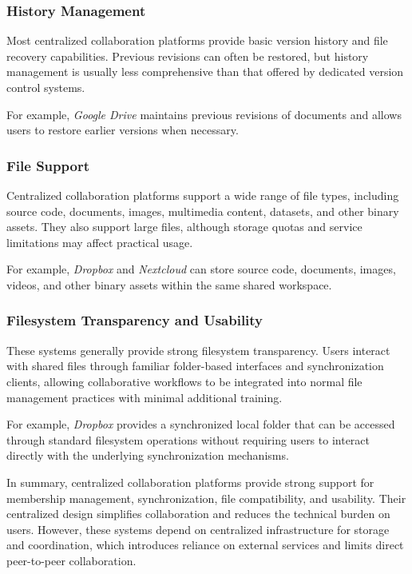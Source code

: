 \subsubsection{History Management}
Most centralized collaboration platforms provide basic version
history and file recovery capabilities. Previous revisions can
often be restored, but history management is usually less
comprehensive than that offered by dedicated version control
systems.

For example, \textit{Google Drive} maintains previous
revisions of documents and allows users to restore earlier
versions when necessary.

\subsubsection{File Support}
Centralized collaboration platforms support a wide range of
file types, including source code, documents, images,
multimedia content, datasets, and other binary assets. They
also support large files, although storage quotas and service
limitations may affect practical usage.

For example, \textit{Dropbox} and \textit{Nextcloud}
can store source code, documents, images, videos, and other
binary assets within the same shared workspace.

\subsubsection{Filesystem Transparency and Usability}
These systems generally provide strong filesystem transparency.
Users interact with shared files through familiar folder-based
interfaces and synchronization clients, allowing collaborative
workflows to be integrated into normal file management
practices with minimal additional training.

For example, \textit{Dropbox} provides a synchronized local
folder that can be accessed through standard filesystem
operations without requiring users to interact directly with
the underlying synchronization mechanisms.

In summary, centralized collaboration platforms provide
strong support for membership management, synchronization,
file compatibility, and usability. Their centralized design
simplifies collaboration and reduces the technical burden on
users. However, these systems depend on centralized
infrastructure for storage and coordination, which introduces
reliance on external services and limits direct peer-to-peer
collaboration.

